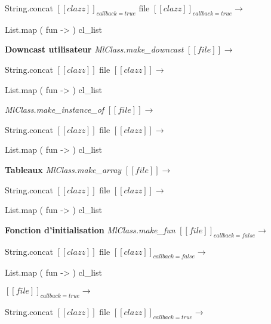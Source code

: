 \documentclass[a4paper, 11pt]{report}
\begin{document}
String.concat $[\![ clazz ]\!]_{callback=true}$ file
\newline
$[\![ clazz ]\!]_{callback=true}$$\longrightarrow$

\begin{OCaml}
     List.map ( fun ->  ) cl_list
\end{OCaml}
 
\textbf{Downcast utilisateur}
\emph{MlClass.make\_downcast}
\newline
$[\![ file ]\!]$$\longrightarrow$

String.concat $[\![ clazz ]\!]$ file
\newline
$[\![ clazz ]\!]$$\longrightarrow$

\begin{OCaml}
     List.map ( fun ->  ) cl_list
\end{OCaml}


\emph{MlClass.make\_instance\_of}
\newline
$[\![ file ]\!]$$\longrightarrow$

String.concat $[\![ clazz ]\!]$ file
\newline
$[\![ clazz ]\!]$$\longrightarrow$

\begin{OCaml}
     List.map ( fun ->  ) cl_list
\end{OCaml}

\textbf{Tableaux}
\emph{MlClass.make\_array}
\newline
$[\![ file ]\!]$$\longrightarrow$

String.concat $[\![ clazz ]\!]$ file
\newline
$[\![ clazz ]\!]$$\longrightarrow$

\begin{OCaml}
     List.map ( fun ->  ) cl_list
\end{OCaml}

\textbf{Fonction d'initialisation}
\emph{MlClass.make\_fun}
\newline
$[\![ file ]\!]_{callback=false}$$\longrightarrow$

String.concat $[\![ clazz ]\!]$ file
\newline
$[\![ clazz ]\!]_{callback=false}$$\longrightarrow$

\begin{OCaml}
     List.map ( fun ->  ) cl_list
\end{OCaml}
$[\![ file ]\!]_{callback=true}$$\longrightarrow$

String.concat $[\![ clazz ]\!]$ file
\newline
$[\![ clazz ]\!]_{callback=true}$$\longrightarrow$
\end{document}
